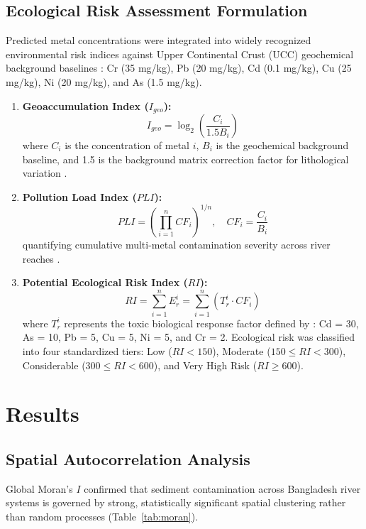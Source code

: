 \documentclass[authoryear,preprint,12pt]{elsarticle}
\begin{document}
\subsection{Ecological Risk Assessment Formulation}
Predicted metal concentrations were integrated into widely recognized environmental risk indices against Upper Continental Crust (UCC) geochemical background baselines \citep{Wedepohl1995}: Cr (35 mg/kg), Pb (20 mg/kg), Cd (0.1 mg/kg), Cu (25 mg/kg), Ni (20 mg/kg), and As (1.5 mg/kg).
\begin{enumerate}
    \item \textbf{Geoaccumulation Index ($I_{geo}$):}
    \begin{equation}
    I_{geo} = \log_2 \left( \frac{C_i}{1.5 B_i} \right)
    \end{equation}
    where $C_i$ is the concentration of metal $i$, $B_i$ is the geochemical background baseline, and 1.5 is the background matrix correction factor for lithological variation \citep{Muller1969}.
    \item \textbf{Pollution Load Index ($PLI$):}
    \begin{equation}
    PLI = \left( \prod_{i=1}^n CF_i \right)^{1/n}, \quad CF_i = \frac{C_i}{B_i}
    \end{equation}
    quantifying cumulative multi-metal contamination severity across river reaches \citep{Tomlinson1980}.
    \item \textbf{Potential Ecological Risk Index ($RI$):}
    \begin{equation}
    RI = \sum_{i=1}^n E_r^i = \sum_{i=1}^n \left( T_r^i \cdot CF_i \right)
    \end{equation}
    where $T_r^i$ represents the toxic biological response factor defined by \citet{Hakanson1980}: Cd = 30, As = 10, Pb = 5, Cu = 5, Ni = 5, and Cr = 2. Ecological risk was classified into four standardized tiers: Low ($RI < 150$), Moderate ($150 \le RI < 300$), Considerable ($300 \le RI < 600$), and Very High Risk ($RI \ge 600$).
\end{enumerate}

\section{Results}

\subsection{Spatial Autocorrelation Analysis}
Global Moran's $I$ confirmed that sediment contamination across Bangladesh river systems is governed by strong, statistically significant spatial clustering rather than random processes (Table~\ref{tab:moran}).
\end{document}

